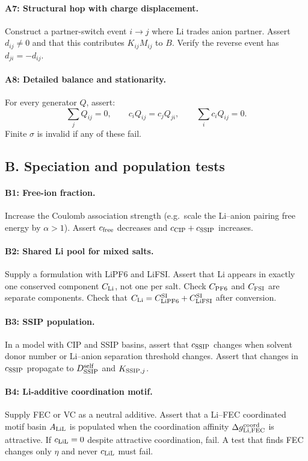 \documentclass[11pt]{article}
\begin{document}
\paragraph{A7: Structural hop with charge displacement.}
Construct a partner-switch event \(i\to j\) where Li trades anion partner.
Assert \(d_{ij}\neq0\) and that this contributes \(K_{ij}M_{ij}\) to \(B\).
Verify the reverse event has \(d_{ji}=-d_{ij}\).

\paragraph{A8: Detailed balance and stationarity.}
For every generator \(Q\), assert:
\[
\sum_j Q_{ij}=0,
\qquad
c_i Q_{ij}=c_j Q_{ji},
\qquad
\sum_i c_i Q_{ij}=0.
\]
Finite \(\sigma\) is invalid if any of these fail.

\subsection{B. Speciation and population tests}

\paragraph{B1: Free-ion fraction.}
Increase the Coulomb association strength (e.g.\ scale the Li--anion pairing
free energy by \(\alpha>1\)). Assert \(c_{\rm free}\) decreases and
\(c_{\rm CIP}+c_{\rm SSIP}\) increases.

\paragraph{B2: Shared Li pool for mixed salts.}
Supply a formulation with LiPF6 and LiFSI. Assert that Li appears in exactly
one conserved component \(C_{\rm Li}\), not one per salt.
Check \(C_{\rm PF6}\) and \(C_{\rm FSI}\) are separate components.
Check that \(C_{\rm Li}=C_{\rm LiPF6}^{\rm SI}+C_{\rm LiFSI}^{\rm SI}\) after conversion.

\paragraph{B3: SSIP population.}
In a model with CIP and SSIP basins, assert that \(c_{\rm SSIP}\) changes
when solvent donor number or Li--anion separation threshold changes.
Assert that changes in \(c_{\rm SSIP}\) propagate to \(D_{\rm SSIP}^{\rm self}\)
and \(K_{{\rm SSIP},j}\).

\paragraph{B4: Li-additive coordination motif.}
Supply FEC or VC as a neutral additive.
Assert that a Li--FEC coordinated motif basin \(A_{\rm LiL}\) is populated
when the coordination affinity \(\Delta g_{\rm Li,FEC}^{\rm coord}\) is attractive.
If \(c_{\rm LiL}=0\) despite attractive coordination, fail.
A test that finds FEC changes only \(\eta\) and never \(c_{\rm LiL}\) must fail.
\end{document}
